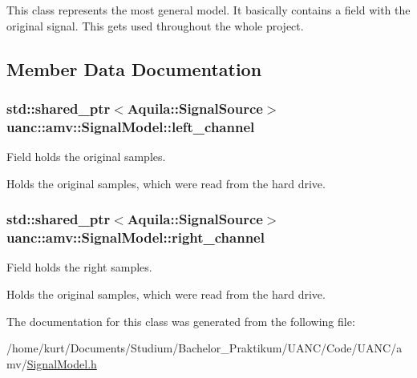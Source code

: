 This class represents the most general model. It basically contains a field with the original signal. This gets used throughout the whole project. 

\subsection{Member Data Documentation}
\subsubsection[{\texorpdfstring{left\+\_\+channel}{left_channel}}]{\setlength{\rightskip}{0pt plus 5cm}std\+::shared\+\_\+ptr$<$Aquila\+::\+Signal\+Source$>$ uanc\+::amv\+::\+Signal\+Model\+::left\+\_\+channel}\hypertarget{classuanc_1_1amv_1_1_signal_model_a608802e04d8ce5d49c730d568f0c3fd7}{}\label{classuanc_1_1amv_1_1_signal_model_a608802e04d8ce5d49c730d568f0c3fd7}


Field holds the original samples. 

Holds the original samples, which were read from the hard drive. 
\subsubsection[{\texorpdfstring{right\+\_\+channel}{right_channel}}]{\setlength{\rightskip}{0pt plus 5cm}std\+::shared\+\_\+ptr$<$Aquila\+::\+Signal\+Source$>$ uanc\+::amv\+::\+Signal\+Model\+::right\+\_\+channel}\hypertarget{classuanc_1_1amv_1_1_signal_model_a97081cc1295d40bc9410e883bcc02a84}{}\label{classuanc_1_1amv_1_1_signal_model_a97081cc1295d40bc9410e883bcc02a84}


Field holds the right samples. 

Holds the original samples, which were read from the hard drive. 

The documentation for this class was generated from the following file\+:\begin{DoxyCompactItemize}
\item 
/home/kurt/\+Documents/\+Studium/\+Bachelor\+\_\+\+Praktikum/\+U\+A\+N\+C/\+Code/\+U\+A\+N\+C/amv/\hyperlink{_signal_model_8h}{Signal\+Model.\+h}\end{DoxyCompactItemize}

